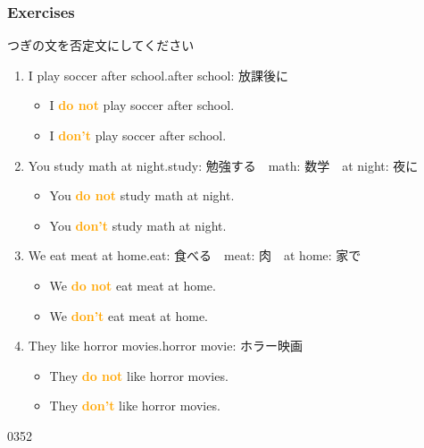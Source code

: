 \documentclass[aspectratio=169,xcolor={dvipsnames,table}]{beamer}
\newcommand{\myaudio}[1]{\href{#1}{\faVolumeUp}}
\begin{document}
\begin{frame}[plain]\frametitle{Exercises}
 
つぎの文を否定文にしてください
\begin{enumerate}
 \item I play soccer after school.\hfill{\scriptsize after school: 放課後に}
         \begin{itemize}[circle]
	 \item<2-> I \textcolor{orange}{\bfseries do not} play soccer after school.
	  \item<3-> I \textcolor{orange}{\bfseries don't} play soccer after school.
	\end{itemize}
 \item You study math at night.\hfill{\scriptsize study: 勉強する　math: 数学　at night: 夜に}
       \begin{itemize}[circle]
	\item<4-> You \textcolor{orange}{\bfseries do not} study math at night.\\
	\item<5-> You \textcolor{orange}{\bfseries don't} study math at night.
       \end{itemize}
 \item We eat meat at home.\hfill{\scriptsize eat: 食べる　meat: 肉　at home: 家で}
        \begin{itemize}[circle]
 \item<6-> We \textcolor{orange}{\bfseries do not} eat meat at home.\\
 \item<7-> We \textcolor{orange}{\bfseries don't} eat meat at home.
       \end{itemize}
 \item They like horror movies.\hfill{\scriptsize horror movie: ホラー映画}
        \begin{itemize}[circle]
 \item<8-> They \textcolor{orange}{\bfseries do not} like horror movies.\\
 \item<9-> They \textcolor{orange}{\bfseries don't} like horror movies.
        \end{itemize}
\end{enumerate}

\hfill{\tiny 0352}\,{\scriptsize \myaudio{audio/007_negative_do_01.mp3}}

\end{frame}
\end{document}
